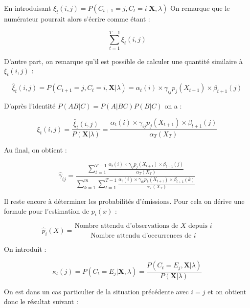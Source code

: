 \documentclass[12pt]{report}
\begin{document}
				En introduisant $\xi_t(i,j) = P(C_{t+1}=j,C_t=i|\bm{X},\lambda)$  On remarque que le numérateur pourrait alors s'écrire comme étant :
				
				\begin{equation}
				\sum\limits_{t=1}^{T-1} \xi_t(i,j) 
				\end{equation}
				
				D'autre part, on remarque qu'il est possible de calculer une quantité similaire à $\xi_t(i,j)$ :
				
				\begin{equation}
				\hat{\xi}_t(i,j) = P(C_{t+1}=j,C_t=i,\bm{X}|\lambda) = \alpha_t(i) \times \gamma_{ij} p_j(X_{t+1}) \times \beta_{t+1}(j)
				\end{equation}
				
				D'après l'identité $P(AB|C)=P(A|BC)P(B|C)$ on a :
				
				\begin{equation}
				\xi_t(i,j) = \frac{\hat{\xi}_t(i,j)}{P(\bm{X}|\lambda)} = \frac{\alpha_t(i) \times \gamma_{ij} p_j(X_{t+1}) \times \beta_{t+1}(j)}{\alpha_T(X_T)}
				\end{equation}
				
				Au final, on obtient :
				
				\begin{equation}
				\hat{\gamma}_{ij} = 
				\frac{\sum\limits_{t=1}^{T-1} \frac{\alpha_t(i) \times \gamma_{ij} p_j(X_{t+1}) \times \beta_{t+1}(j)}
					{\alpha_T(X_T)}}
					{\sum\limits_{k=1}^m \sum\limits_{t=1}^{T-1} \frac{\alpha_t(i) \times \gamma_{ik} p_k(X_{t+1}) \times \beta_{t+1}(k)}	   {\alpha_T(X_T)}}
					\end{equation}
					
					Il reste encore à déterminer les probabilités d'émissions. Pour cela on dérive une formule pour l'estimation de $p_i(x)$ : 
					
					\begin{equation}
					\hat{p}_i(X) = \frac{\text{Nombre attendu d'observations de }X\text{ depuis }i}
					{\text{Nombre attendu d'occurrences  de }i}
					\end{equation}
					
					On introduit :
					
					\begin{equation}
					\kappa_t(j) = P(C_t=E_j|\bm{X},\lambda) = \frac{P(C_t=E_j,\bm{X}|\lambda)}{P(\bm{X}|\lambda)}
					\end{equation} 
					
					On est dans un cas particulier de la situation précédente avec $i=j$ et on obtient donc le résultat suivant :
					
\end{document}
